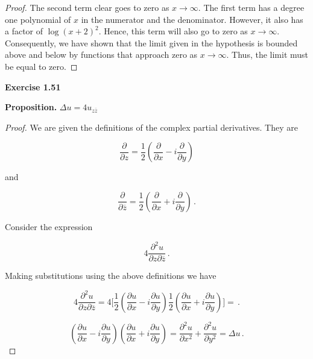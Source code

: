 \documentclass[a4paper]{article}
\numberwithin{equation}{section}
\begin{document}
\begin{description}
\begin{proof}
The second term clear goes to zero as $x \rightarrow \infty$. The first term has a degree one polynomial of $x$ in the numerator and the denominator. However, it also has a factor of $\log(x+2)^2$. Hence, this term will also go to zero as $x \rightarrow \infty$. Consequently, we have shown that the limit given in the hypothesis is bounded above and below by functions that approach zero as $x \rightarrow \infty$. Thus, the limit must be equal to zero.

\end{proof}

\item \textbf{Exercise 1.51}

\item \textbf{Proposition.} $\Delta u = 4u_{z\overline{z}}$

\begin{proof} We are given the definitions of the complex partial derivatives. They are

$$\frac{\partial}{\partial z} = \frac{1}{2}(\frac{\partial}{\partial x} - i\frac{\partial}{\partial y})$$

and

$$\frac{\partial}{\partial\overline{z}} = \frac{1}{2}(\frac{\partial}{\partial x} + i\frac{\partial}{\partial y})\,.$$

Consider the expression 

$$4\frac{\partial^2u}{\partial z \partial\overline{z}}\,.$$

Making substitutions using the above definitions we have

$$4\frac{\partial^2u}{\partial z \partial\overline{z}} = 4\Big[\frac{1}{2}(\frac{\partial u}{\partial x} - i\frac{\partial u}{\partial y})\frac{1}{2}(\frac{\partial u}{\partial x} + i\frac{\partial u}{\partial y})\Big] = \,.$$

$$(\frac{\partial u}{\partial x} - i\frac{\partial u}{\partial y})(\frac{\partial u}{\partial x} + i\frac{\partial u}{\partial y}) = \frac{\partial^2u}{\partial x^2} + \frac{\partial^2 u}{\partial y^2} = \Delta u\,.$$

\end{proof}

\end{description} 
\end{document}
